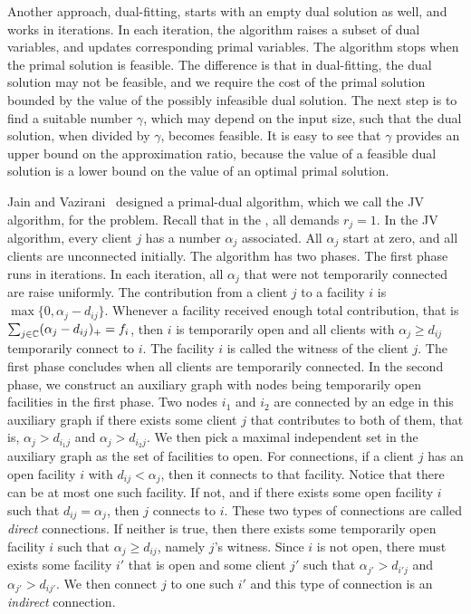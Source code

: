 \documentclass[oneside,final]{ucr}
\begin{document}
Another approach, dual-fitting, starts with an empty dual
solution as well, and works in iterations. In each
iteration, the algorithm raises a subset of dual variables,
and updates corresponding primal variables. The algorithm
stops when the primal solution is feasible. The difference
is that in dual-fitting, the dual solution may not be
feasible, and we require the cost of the primal solution
bounded by the value of the possibly infeasible dual
solution. The next step is to find a suitable number
$\gamma$, which may depend on the input size, such that the
dual solution, when divided by $\gamma$, becomes
feasible. It is easy to see that $\gamma$ provides an upper
bound on the approximation ratio, because the value of a
feasible dual solution is a lower bound on the value of an
optimal primal solution.

Jain and Vazirani~\cite{JainV01} designed a primal-dual
algorithm, which we call the JV algorithm, for the {\UFL}
problem. Recall that in the {\UFL}, all demands $r_j =
1$. In the JV algorithm, every client $j$ has a number
$\alpha_j$ associated. All $\alpha_j$ start at zero, and all
clients are unconnected initially. The algorithm has two
phases. The first phase runs in iterations. In each
iteration, all $\alpha_j$ that were not temporarily
connected are raise uniformly. The contribution from a
client $j$ to a facility $i$ is $\max\{0, \alpha_j -
d_{ij}\}$. Whenever a facility received enough total
contribution, that is $\sum_{j\in\mathbb{C}} (\alpha_j -
d_{ij})_+ = f_i$, then $i$ is temporarily open and all
clients with $\alpha_j \geq d_{ij}$ temporarily connect to
$i$. The facility $i$ is called the witness of the client
$j$. The first phase concludes when all clients are
temporarily connected. In the second phase, we construct an
auxiliary graph with nodes being temporarily open facilities
in the first phase. Two nodes $i_1$ and $i_2$ are connected
by an edge in this auxiliary graph if there exists some
client $j$ that contributes to both of them, that is,
$\alpha_j > d_{i_1 j}$ and $\alpha_j > d_{i_2 j}$. We then
pick a maximal independent set in the auxiliary graph as the
set of facilities to open. For connections, if a client $j$
has an open facility $i$ with $d_{ij} < \alpha_j$, then it
connects to that facility. Notice that there can be at most
one such facility. If not, and if there exists some open
facility $i$ such that $d_{ij} = \alpha_j$, then $j$
connects to $i$. These two types of connections are called
\emph{direct} connections. If neither is true, then there
exists some temporarily open facility $i$ such that
$\alpha_j \geq d_{ij}$, namely $j$'s witness. Since $i$ is
not open, there must exists some facility $i'$ that is open
and some client $j'$ such that $\alpha_{j'} > d_{i'j}$ and
$\alpha_{j'} > d_{i j'}$. We then connect $j$ to one such
$i'$ and this type of connection is an \emph{indirect}
connection. 
\end{document}
